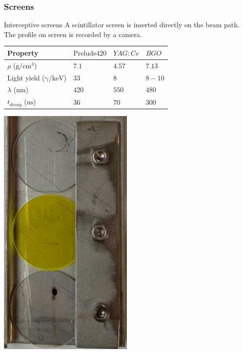\begin{frame}[t]
\begin{columns}[T]
\begin{column}{0.45\textwidth}
    \end{column}
  \end{columns}
\end{frame}

\begin{frame}[t]
  \frametitle{Screens}
  \begin{block}{Interceptive screens}
    A scintillator screen is inserted directly on the beam path.
    The profile on screen is recorded by a camera.
  \end{block}
  \begin{tabularx}{\linewidth}{XXXX}
    \toprule
    Property                            & $\mathrm{Prelude}420$ & $YAG:Ce$ & $BGO$  \\
    \midrule
    $\rho$ ($\mathrm{g/cm^3}$)          & $7.1$                 & $4.57$   & $7.13$ \\
    Light yield ($\mathrm{\gamma/keV}$) & $33$                  & $8$      & $8-10$ \\
    $\lambda$ ($\mathrm{nm}$)           & $420$                 & $550$    & $480$  \\
    $t_{decay}$ ($\mathrm{ns}$)         & $36$                  & $70$     & $300$  \\
    \bottomrule
  \end{tabularx}
  \centering
  \includegraphics[angle=90,width=0.5\textwidth]{06_Backup/fig/fig000_ecran}
\end{frame}

